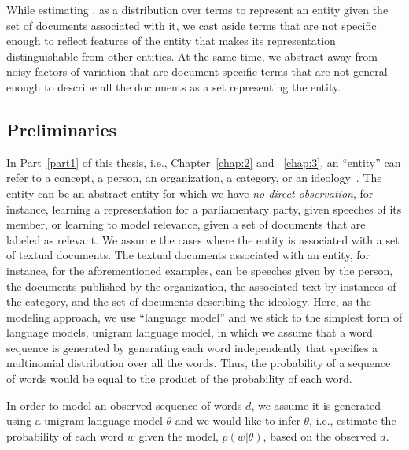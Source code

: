 While estimating \acswlm, as a distribution over terms to represent an entity given the set of documents associated with it, we cast aside terms that are not specific enough to reflect features of the entity that makes its representation distinguishable from other entities. At the same time, we abstract away from noisy factors of variation that are document specific terms that are not general enough to describe all the documents as a set representing the entity.


\subsection{Preliminaries}
\label{chap2_preliminaries}
In Part~\ref{part1} of this thesis, i.e., Chapter~\ref{chap:2} and ~\ref{chap:3}, an ``entity'' can refer to a concept, a person, an organization, a category, or an ideology~\citep{Dehghani:2016:SIGIR}. The entity can be an abstract entity for which we have \emph{no direct observation}, for instance, learning a representation for a parliamentary party, given speeches of its member, or learning to model relevance, given a set of documents that are labeled as relevant.
We assume the cases where the entity is associated with a set of textual documents. The textual documents associated with an entity, for instance, for the aforementioned examples, can be speeches given by the person, the documents published by the organization, the associated text by instances of the category, and the set of documents describing the ideology.
%
%
Here, as the modeling approach, we use ``language model'' and we stick to the simplest form of language models, unigram language model, in which we assume that a word sequence is generated by generating each word independently that specifies a multinomial distribution over all the words. Thus, the probability of a sequence of words would be equal to the product of the probability of each word.  

In order to model an observed sequence of words $d$, we assume it is generated using a unigram language model $\theta$ and we would like to infer $\theta$, i.e., estimate the probability of each word $w$ given the model, $p(w|\theta)$, based on the observed $d$. 

